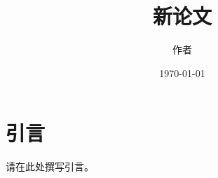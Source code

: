 \documentclass{article}
\title{新论文}
\author{作者}
\date{\today}
\begin{document}
\maketitle
\tableofcontents
\section{引言}
请在此处撰写引言。
\end{document}
